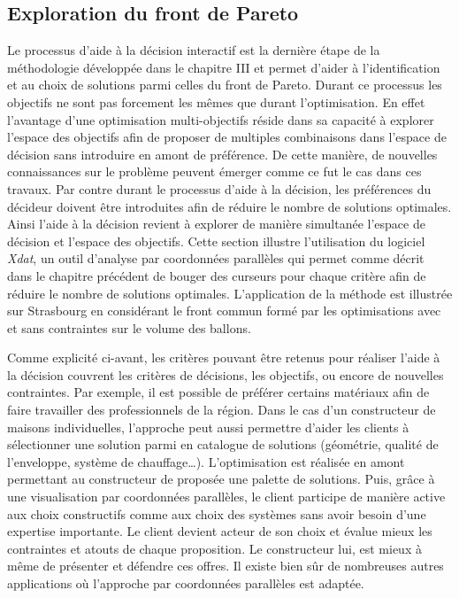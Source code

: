\subsection{Exploration du front de Pareto} %
\label{sub:exploration_du_front_de_pareto}
Le processus d’aide à la décision interactif est la dernière étape de la méthodologie
développée dans le chapitre III et permet d’aider à l’identification et au choix de
solutions parmi celles du front de Pareto. Durant ce processus les objectifs ne sont pas
forcement les mêmes que durant l’optimisation. En effet l’avantage d’une optimisation
multi-objectifs réside dans sa capacité à explorer l’espace des objectifs afin de proposer
de multiples combinaisons dans l’espace de décision sans introduire en amont de
préférence. De cette manière, de nouvelles connaissances sur le problème peuvent émerger
comme ce fut le cas dans ces travaux. Par contre durant le processus d’aide à la décision,
les préférences du décideur doivent être introduites afin de réduire le nombre de
solutions optimales. Ainsi l’aide à la décision revient à explorer de manière simultanée
l’espace de décision et l’espace des objectifs. Cette section illustre l’utilisation du
logiciel \textit{Xdat}, un outil d’analyse par coordonnées parallèles qui permet comme
décrit dans le chapitre précédent de bouger des curseurs pour chaque critère afin de
réduire le nombre de solutions optimales. L’application de la méthode est illustrée
sur Strasbourg en considérant le front commun formé par les optimisations avec et sans
contraintes sur le volume des ballons.

Comme explicité ci-avant, les critères pouvant être retenus pour réaliser l’aide à la
décision couvrent les critères de décisions, les objectifs, ou encore de nouvelles
contraintes. Par exemple, il est possible de préférer certains matériaux afin de faire
travailler des professionnels de la région. Dans le cas d’un constructeur de maisons
individuelles, l’approche peut aussi permettre d’aider les clients à sélectionner une solution
parmi en catalogue de solutions (géométrie, qualité de l’enveloppe, système de chauffage\dots).
L’optimisation est réalisée en amont permettant au constructeur de proposée une palette de
solutions. Puis, grâce à une visualisation par coordonnées parallèles, le client participe
de manière active aux choix constructifs comme aux choix des systèmes sans avoir besoin
d’une expertise importante. Le client devient acteur de son choix et évalue mieux
les contraintes et atouts de chaque proposition. Le constructeur lui, est mieux à même de
présenter et défendre ces offres. Il existe bien sûr de nombreuses autres applications où
l’approche par coordonnées parallèles est adaptée.

